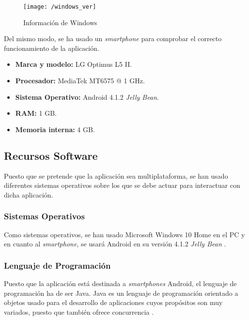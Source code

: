 \begin{figure}[!h]
	\begin{center}
		\texttt{[image: /windows\_ver]}
		\caption{Información de Windows}
		\label{fig:winver}
	\end{center}
\end{figure}

Del mismo modo, se ha usado un \textit{smartphone} para comprobar el correcto funcionamiento de la aplicación.

\begin{itemize}
	\item \textbf{Marca y modelo:} LG Optimus L5 II.
	\item \textbf{Procesador:} MediaTek MT6575 @ 1 \acs{GHz}.
	\item \textbf{Sistema Operativo:} Android 4.1.2 \textit{Jelly Bean}.
	\item \textbf{RAM:} 1 \acs{GB}.
	\item \textbf{Memoria interna:} 4 \acs{GB}.
\end{itemize}

\subsection{Recursos Software}
Puesto que se pretende que la aplicación sea multiplataforma, se han usado diferentes sistemas operativos sobre los que se debe actuar para interactuar con dicha aplicación.

\subsubsection*{Sistemas Operativos}
Como sistemas operativos, se han usado Microsoft Windows 10 Home \cite{Microsoft} en el PC y en cuanto al \textit{smartphone}, se usará Android en su versión 4.1.2 \textit{Jelly Bean} \cite{Andro}.

\subsubsection*{Lenguaje de Programación}
Puesto que la aplicación está destinada a \textit{smartphones} Android, el lenguaje de programación ha de ser Java. Java es un lenguaje de programación orientado a objetos usado para el desarrollo de aplicaciones cuyos propósitos son muy variados, puesto que también ofrece concurrencia \cite{Java}.

